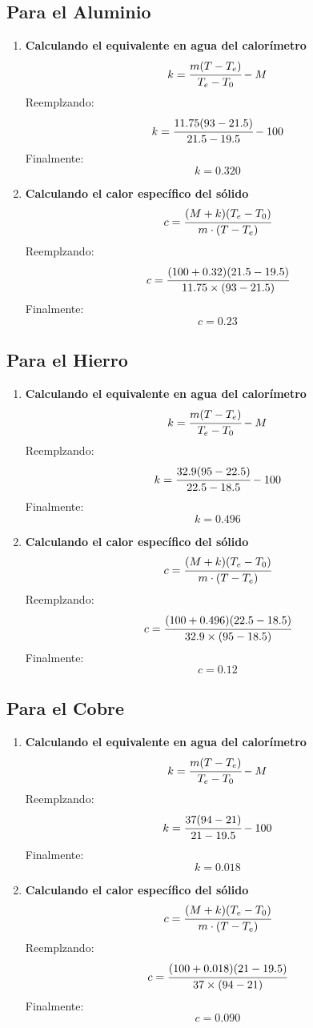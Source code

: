 \subsection{Para el Aluminio}
\begin{enumerate}[label=\bfseries\alph*.-,itemsep=2pt, partopsep=6pt]
	\item \textbf{Calculando el equivalente en agua del calorímetro}
	      \[k=\cfrac{m(T-T_e)}{T_e-T_0}-M\]
	      Reemplzando:
	      \[k=\cfrac{11.75(93-21.5)}{21.5-19.5}-100\]
	      Finalmente:
	      \[k=0.320\]
	\item \textbf{Calculando el calor específico del sólido}
	      \[c=\cfrac{(M+k)(T_e-T_0)}{m\cdot(T-T_e)}\]
	      Reemplzando:
	      \[c=\cfrac{(100+0.32)(21.5-19.5)}{11.75\times(93-21.5)}\]
	      Finalmente:
	      \[c=0.23\]
\end{enumerate}
\subsection{Para el Hierro}
\begin{enumerate}[label=\bfseries\alph*.-,itemsep=2pt, partopsep=6pt]
	\item \textbf{Calculando el equivalente en agua del calorímetro}
	      \[k=\cfrac{m(T-T_e)}{T_e-T_0}-M\]
	      Reemplzando:
	      \[k=\cfrac{32.9(95-22.5)}{22.5-18.5}-100\]
	      Finalmente:
	      \[k=0.496\]
	\item \textbf{Calculando el calor específico del sólido}
	      \[c=\cfrac{(M+k)(T_e-T_0)}{m\cdot(T-T_e)}\]
	      Reemplzando:
	      \[c=\cfrac{(100+0.496)(22.5-18.5)}{32.9\times(95-18.5)}\]
	      Finalmente:
	      \[c=0.12\]
\end{enumerate}
\subsection{Para el Cobre}
\begin{enumerate}[label=\bfseries\alph*.-,itemsep=2pt, partopsep=6pt]
	\item \textbf{Calculando el equivalente en agua del calorímetro}
	      \[k=\cfrac{m(T-T_e)}{T_e-T_0}-M\]
	      Reemplzando:
	      \[k=\cfrac{37(94-21)}{21-19.5}-100\]
	      Finalmente:
	      \[k=0.018\]
	\item \textbf{Calculando el calor específico del sólido}
	      \[c=\cfrac{(M+k)(T_e-T_0)}{m\cdot(T-T_e)}\]
	      Reemplzando:
	      \[c=\cfrac{(100+0.018)(21-19.5)}{37\times(94-21)}\]
	      Finalmente:
	      \[c=0.090\]
\end{enumerate}
